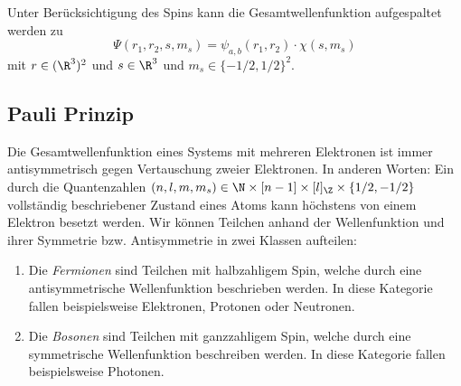\documentclass{subfiles}
\begin{document}

    Unter Berücksichtigung des Spins kann die Gesamtwellenfunktion aufgespaltet werden zu
    \[
        \Psi(r_1,r_2,s,m_s) = \psi_{a,b}(r_1,r_2)\cdot\chi(s,m_s)    
    \]
    mit $r\in(\R^3)^2$ und $s\in\R^3$ und $m_s\in\{-1/2,1/2\}^2$. 

    \subsection{Pauli Prinzip}
        Die Gesamtwellenfunktion eines Systems mit mehreren Elektronen ist immer antisymmetrisch gegen Vertauschung zweier Elektronen. In anderen Worten: 
        Ein durch die Quantenzahlen $(n,l,m,m_s)\in\N\times[n-1]\times[l]_\Z\times\{1/2,-1/2\}$ vollständig beschriebener Zustand eines Atoms kann höchstens von einem Elektron besetzt werden. Wir können Teilchen anhand der Wellenfunktion und ihrer Symmetrie bzw. Antisymmetrie in zwei Klassen aufteilen:
        \begin{enumerate}[label=(\roman*)]
            \item Die \emph{Fermionen} sind Teilchen mit halbzahligem Spin, welche durch eine antisymmetrische Wellenfunktion beschrieben werden. In diese Kategorie fallen beispielsweise Elektronen, Protonen oder Neutronen.
            \item Die \emph{Bosonen} sind Teilchen mit ganzzahligem Spin, welche durch eine symmetrische Wellenfunktion beschreiben werden. In diese Kategorie fallen beispielsweise Photonen.
        \end{enumerate}
\end{document}
